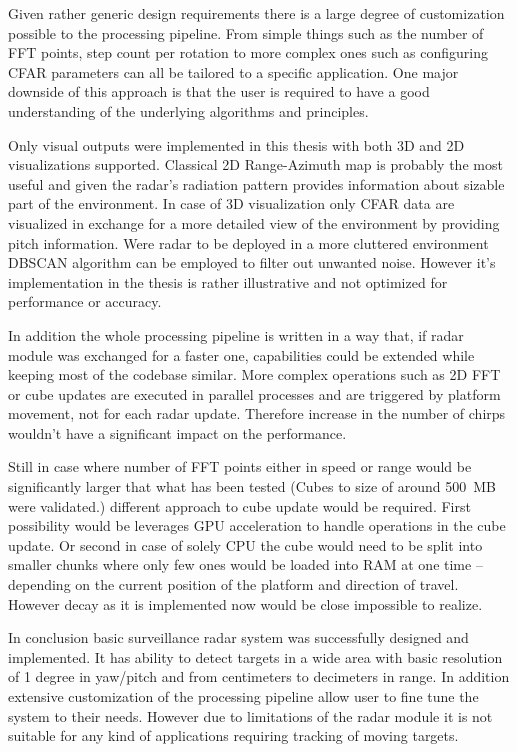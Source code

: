 Given rather generic design requirements there is a large degree of customization possible to the processing pipeline.
From simple things such as the number of FFT points, step count per rotation to more complex ones such as configuring CFAR parameters can all be tailored to a specific application.
One major downside of this approach is that the user is required to have a good understanding of the underlying algorithms and principles.

Only visual outputs were implemented in this thesis with both 3D and 2D visualizations supported.
Classical 2D Range-Azimuth map is probably the most useful and given the radar's radiation pattern provides information about sizable part of the environment.
In case of 3D visualization only CFAR data are visualized in exchange for a more detailed view of the environment by providing pitch information.
Were radar to be deployed in a more cluttered environment DBSCAN algorithm can be employed to filter out unwanted noise.
However it's implementation in the thesis is rather illustrative and not optimized for performance or accuracy.

In addition the whole processing pipeline is written in a way that, if radar module was exchanged for a faster one, capabilities could be extended while keeping most of the codebase similar.
More complex operations such as 2D FFT or cube updates are executed in parallel processes and are triggered by platform movement, not for each radar update.
Therefore increase in the number of chirps wouldn't have a significant impact on the performance.

Still in case where number of FFT points either in speed or range would be significantly larger that what has been tested (Cubes to size of around 500~MB were validated.) different approach to cube update would be required.
First possibility would be leverages GPU acceleration to handle operations in the cube update.
Or second in case of solely CPU the cube would need to be split into smaller chunks where only few ones would be loaded into RAM at one time -- depending on the current position of the platform and direction of travel.
However decay as it is implemented now would be close impossible to realize.

In conclusion basic surveillance radar system was successfully designed and implemented.
It has ability to detect targets in a wide area with basic resolution of 1 degree in yaw/pitch and from centimeters to decimeters in range.
In addition extensive customization of the processing pipeline allow user to fine tune the system to their needs.
However due to limitations of the radar module it is not suitable for any kind of applications requiring tracking of moving targets.
